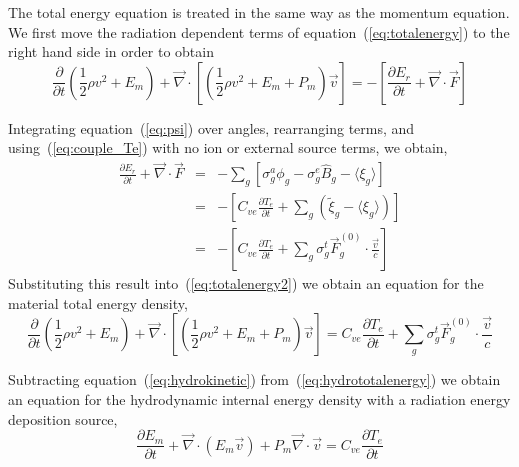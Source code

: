 \documentclass[12pt]{article}
\newcommand{\partl}[2]{\ensuremath{\frac{\partial{#1}}{\partial{#2}}}}\newcommand{\del}{\ensuremath{\vec{\nabla}}}
\newcommand{\Bg}{\ensuremath{\hat{B}_{g}}}
\begin{document}
The total energy equation is treated in the same way as the
momentum equation.
We first move the radiation dependent terms of equation~(\ref{eq:totalenergy})
to the right hand side in order to obtain
\begin{equation}
        \partl{}{t}\left( \frac{1}{2} \rho v^2
                          + E_{m}\right)
         + \del \cdot \left[
              \left( \frac{1}{2} \rho v^2 + E_{m} + P_{m} \right) \vec{v}
                      \right]
    =
        - \left[ \partl{E_{r}}{t} + \del \cdot \vec{F} \right]
\label{eq:totalenergy2}
\end{equation}

Integrating equation~(\ref{eq:psi}) over angles, rearranging terms,
and using~(\ref{eq:couple_Te}) with no ion or external source terms,
we obtain,
\begin{eqnarray}
   \partl{E_{r}}{t} + \del \cdot \vec{F}
  &=&
    - \sum_{g} \left[ \sigma^{a}_{g} \phi_{g} - \sigma^{e}_{g} \Bg
    - \langle \xi_{g} \rangle \right]
  \\
  &=& 
    - \left[ C_{ve} \partl{T_{e}}{t} + \sum_{g} \left( \tilde{\xi}_{g} 
             - \langle \xi_{g} \rangle \right) \right]
  \\
  &=& 
    - \left[ C_{ve} \partl{T_{e}}{t}
             + \sum_{g} \sigma^{t}_{g} \vec{F}^{(0)}_{g} \cdot \frac{\vec{v}}{c}
      \right]
\end{eqnarray}
Substituting this result into~(\ref{eq:totalenergy2}) we obtain an equation
for the material total energy density,
\begin{equation}
        \partl{}{t}\left( \frac{1}{2} \rho v^2
                          + E_{m}\right)
         + \del \cdot \left[
              \left( \frac{1}{2} \rho v^2 + E_{m} + P_{m} \right) \vec{v}
                      \right]
    =
         C_{ve} \partl{T_{e}}{t}
            + \sum_{g} \sigma^{t}_{g} \vec{F}^{(0)}_{g} \cdot \frac{\vec{v}}{c} 
\label{eq:hydrototalenergy}
\end{equation}

Subtracting equation~(\ref{eq:hydrokinetic}) from~(\ref{eq:hydrototalenergy})
we obtain an equation for the hydrodynamic internal energy density with
a radiation energy deposition source,
\begin{equation}
  \boxed{
        \partl{E_{m}}{t}
         + \del \cdot \left( E_{m} \vec{v} \right) 
         + P_{m} \del \cdot \vec{v}
    =
         C_{ve} \partl{T_{e}}{t}
  }
\label{eq:hydrointernalenergy}
\end{equation}
\end{document}
